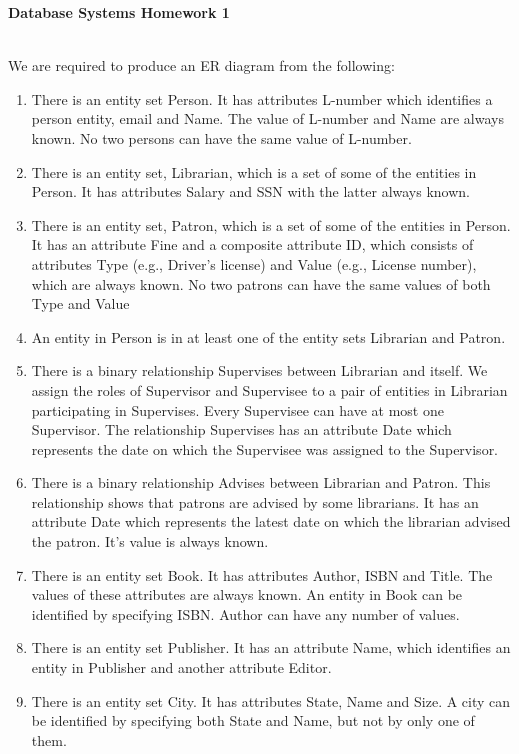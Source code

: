 \documentclass[9pt]{article}
\begin{document}
\begin{center}
\textbf{Database Systems Homework 1}
\end{center}

\\ We are required to produce an ER diagram from the following:
\begin{enumerate}
    \item There is an entity set Person. It has attributes L-number which identifies a person entity, email and Name. The value of L-number and Name are always known. No two persons can have the same value of L-number.
    \item There is an entity set, Librarian, which is a set of some of the entities in Person. It has attributes Salary and SSN with the latter always known.
    \item There is an entity set, Patron, which is a set of some of the entities in Person. It has an attribute Fine and a composite attribute ID, which consists of attributes Type (e.g., Driver’s license) and Value (e.g., License number), which are always known. No two patrons can have the same values of both Type and Value
    \item An entity in Person is in at least one of the entity sets Librarian and Patron.
    \item There is a binary relationship Supervises between Librarian and itself. We assign the roles of Supervisor and Supervisee to a pair of entities in Librarian participating in Supervises. Every Supervisee can have at most one Supervisor. The relationship Supervises has an attribute Date which represents the date on which the Supervisee was assigned to the Supervisor.
    \item There is a binary relationship Advises between Librarian and Patron. This relationship shows that patrons are advised by some librarians. It has an attribute Date which represents the latest date on which the librarian advised the patron. It’s value is always known.
    \item There is an entity set Book. It has attributes Author, ISBN and Title. The values of these attributes are always known. An entity in Book can be identified by specifying ISBN. Author can have any number of values.
    \item There is an entity set Publisher. It has an attribute Name, which identifies an entity in Publisher and another attribute Editor.
    \item There is an entity set City. It has attributes State, Name and Size. A city can be identified by specifying both State and Name, but not by only one of them.

\end{enumerate}
\end{document}
